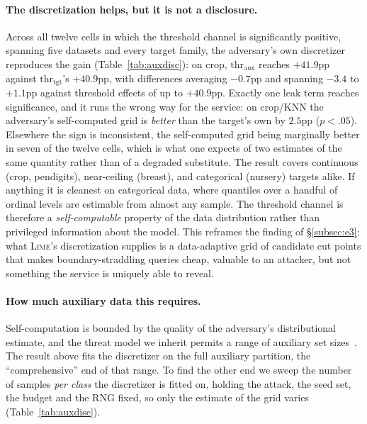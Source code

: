 \documentclass[sigconf,anonymous,review]{acmart}
\begin{document}
\paragraph{The discretization helps, but it is not a disclosure.} Across all twelve cells in which the
threshold channel is significantly positive, spanning five datasets and every target family, the adversary's own discretizer reproduces the gain (Table~\ref{tab:auxdisc}): on crop,
$\text{thr}_{\text{aux}}$ reaches $+41.9$pp against $\text{thr}_{\text{tgt}}$'s $+40.9$pp, with
differences averaging $-0.7$pp and spanning $-3.4$ to $+1.1$pp against threshold effects of up to
$+40.9$pp. Exactly one leak term reaches significance, and it runs the wrong way for the service:
on crop/KNN the adversary's self-computed grid is \emph{better} than the target's own by $2.5$pp
($p{<}.05$). Elsewhere the sign is inconsistent, the self-computed grid being marginally better in
seven of the twelve cells, which is what one expects of two estimates of the same quantity rather
than of a degraded substitute.
The result covers continuous (crop, pendigits), near-ceiling (breast), and categorical (nursery) targets alike. If anything it is cleanest on categorical data, where quantiles over a handful of
ordinal levels are estimable from almost any sample. The threshold channel is therefore a
\emph{self-computable} property of the data distribution rather than privileged information about the
model. This reframes the finding of \S\ref{subsec:e3}: what \textsc{Lime}'s discretization supplies is
a data-adaptive grid of candidate cut points that makes boundary-straddling queries cheap, valuable to an attacker, but not something the service is uniquely able to reveal.

\paragraph{How much auxiliary data this requires.} Self-computation is bounded by the quality of the
adversary's distributional estimate, and the threat model we inherit permits a range of auxiliary set
sizes~\cite{oksuz2024autolycus}. The result above fits the discretizer on the full auxiliary
partition, the ``comprehensive'' end of that range. To find the other end we sweep the number of
samples \emph{per class} the discretizer is fitted on, holding the attack, the seed set, the budget
and the RNG fixed, so only the estimate of the grid varies (Table~\ref{tab:auxdisc}).
\end{document}
